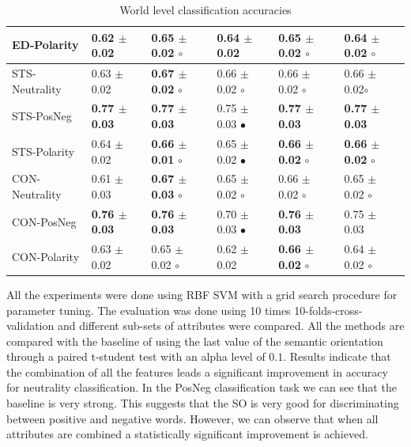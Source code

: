 \documentclass{sig-alternate}
\begin{document}
\begin{table}[htbp]
\begin{center}
\begin{tabular}{l|l|l|l|l|l}
ED-Polarity & 0.62 $\pm$ 0.02 &  \textbf{0.65 $\pm$0.02} $\circ$ & 0.64 $\pm$ 0.02 & \textbf{0.65 $\pm$ 0.02} $\circ$ & 0.64 $\pm$ 0.02 $\circ$ \\ \hline
STS-Neutrality & 0.63 $\pm$ 0.02 & \textbf{0.67 $\pm$ 0.02} $\circ$             & 0.66 $\pm$ 0.02 $\circ$  & 0.66 $\pm$ 0.02 $\circ$ & 0.66 $\pm$ 0.02$\circ$ \\ 
STS-PosNeg & \textbf{0.77 $\pm$ 0.03} &  \textbf{0.77 $\pm$ 0.03} & 0.75 $\pm$ 0.03 $\bullet$ & \textbf{0.77 $\pm$ 0.03} & \textbf{0.77 $\pm$ 0.03} \\ 
STS-Polarity & 0.64 $\pm$ 0.02 & \textbf{0.66 $\pm$ 0.01} $\circ$  & 0.65 $\pm$ 0.02 $\bullet$  & \textbf{0.66 $\pm$ 0.02} $\circ$ & \textbf{0.66 $\pm$ 0.02} $\circ$ \\ \hline
CON-Neutrality & 0.61 $\pm$ 0.03 & \textbf{0.67 $\pm$ 0.03}  $\circ$ & 0.65 $\pm$ 0.02 $\circ$ & 0.66 $\pm$ 0.02  $\circ$ & 0.65 $\pm$ 0.02 $\circ$ \\ 
CON-PosNeg & \textbf{0.76 $\pm$ 0.03} & \textbf{0.76 $\pm$ 0.03} & 0.70 $\pm$ 0.03 $\bullet$ & \textbf{0.76 $\pm$ 0.03} & 0.75 $\pm$ 0.03 \\ 
CON-Polarity & 0.63 $\pm$ 0.02 & 0.65 $\pm$ 0.02 $\circ$ & 0.62 $\pm$ 0.02  & \textbf{0.66 $\pm$ 0.02}  $\circ$ & 0.64 $\pm$ 0.02 $\circ$ \\ \hline
\end{tabular}
\caption{World level classification accuracies} 
\end{center}
\label{}
\end{table}







All the experiments were done using RBF SVM with a grid search procedure for parameter tuning. The evaluation was done using 10 times 10-folds-cross-validation and different sub-sets of attributes were compared.  All the methods are compared with the baseline of using the last value of the semantic orientation through a paired t-student test with an alpha level of $0.1$.   
Results indicate that the combination of all the features leads a significant improvement in accuracy for neutrality classification.  In the PosNeg classification task we can see that the baseline is very strong. This suggests that the SO is very good for discriminating between positive and negative words. However, we can observe that when all attributes are combined a statistically significant improvement is achieved.
\end{document}
